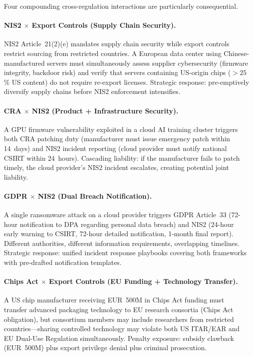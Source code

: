 \documentclass[11pt,a4paper]{article}
\begin{document}
Four compounding cross-regulation interactions are particularly consequential.

\paragraph{NIS2 $\times$ Export Controls (Supply Chain Security).} NIS2 Article~21(2)(e) mandates supply chain security while export controls restrict sourcing from restricted countries. A European data center using Chinese-manufactured servers must simultaneously assess supplier cybersecurity (firmware integrity, backdoor risk) and verify that servers containing US-origin chips ($>25$\% US content) do not require re-export licenses. Strategic response: pre-emptively diversify supply chains before NIS2 enforcement intensifies.

\paragraph{CRA $\times$ NIS2 (Product + Infrastructure Security).} A GPU firmware vulnerability exploited in a cloud AI training cluster triggers both CRA patching duty (manufacturer must issue emergency patch within 14~days) and NIS2 incident reporting (cloud provider must notify national CSIRT within 24~hours). Cascading liability: if the manufacturer fails to patch timely, the cloud provider's NIS2 incident escalates, creating potential joint liability.

\paragraph{GDPR $\times$ NIS2 (Dual Breach Notification).} A single ransomware attack on a cloud provider triggers GDPR Article~33 (72-hour notification to DPA regarding personal data breach) and NIS2 (24-hour early warning to CSIRT, 72-hour detailed notification, 1-month final report). Different authorities, different information requirements, overlapping timelines. Strategic response: unified incident response playbooks covering both frameworks with pre-drafted notification templates.

\paragraph{Chips Act $\times$ Export Controls (EU Funding + Technology Transfer).} A US chip manufacturer receiving EUR~500M in Chips Act funding must transfer advanced packaging technology to EU research consortia (Chips Act obligation), but consortium members may include researchers from restricted countries---sharing controlled technology may violate both US ITAR/EAR and EU Dual-Use Regulation simultaneously. Penalty exposure: subsidy clawback (EUR~500M) plus export privilege denial plus criminal prosecution.
\end{document}
